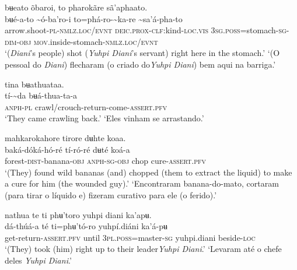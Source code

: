 \documentclass[output=paper,
modfonts,nonflat
]{langsci/langscibook}
\begin{document}
\ea bʉeato õbaroi, to pharokãre sã'aphaato.\\[.3em]
\gll bʉé-a-to	{\textasciitilde}ó-ba'ro-i	to=phá-ro-{\textasciitilde}ka{\footnotemark}-re	{\textasciitilde}sa'á-pha-to\\
     arrow.shoot-\textsc{pl-nmlz.loc/evnt}	\textsc{deic.prox-clf:}kind-\textsc{loc.vis}	3\textsc{sg.poss}=stomach\textsc{-sg-dim-obj}	\textsc{mov.}inside-stomach-\textsc{nmlz.loc/evnt}\\
\glt ‘(\textit{Diani}'s people) shot (\textit{Yuhpi Diani}'s servant) right here in the stomach.’
\glt ‘(O pessoal do \textit{Diani}) flecharam (o criado do\textit{Yuhpi Diani}) bem aqui na barriga.’
\z 

\ea tina bʉathuataa.\\[.3em]
\gll tí-{\textasciitilde}da	bʉá-thua-ta-a\\
     \textsc{anph-pl}	crawl/crouch-return-come-\textsc{assert.pfv}\\
\glt ‘They came crawling back.’ 
\glt ‘Eles vinham se arrastando.’
\z 

\ea mahkarokahore tirore dʉhte koaa.\\[.3em]
\gll {\textasciitilde}baká-dóká{\footnotemark}-hó-ré	tí-ró-ré	dʉté	koá-a\\
     forest-\textsc{dist}-banana\textsc{-obj}	\textsc{anph-sg-obj}	chop	cure-\textsc{assert.pfv}\\
\glt ‘(They) found wild bananas (and) chopped (them to extract the liquid) to make a cure for him (the wounded guy).’
\newpage
\glt ‘Encontraram banana-do-mato, cortaram (para tirar o líquido e) fizeram curativo para ele (o ferido).’
\z 

\ea nathua te ti phʉ'toro yuhpi diani ka'apʉ.\\[.3em]
\gll {\textasciitilde}dá-thúá-a	té	ti=phʉ'tó-ro	yuhpí.diáni	ka'á-pʉ\\
     get-return-\textsc{assert.pfv}	until	3\textsc{pl.poss}=master\textsc{-sg}	yuhpi.diani	beside-\textsc{loc}\\
\glt ‘(They) took (him) right up to their leader\textit{Yuhpi Diani}.’
\glt ‘Levaram até o chefe deles \textit{Yuhpi Diani}.’
\z 
\end{document}
